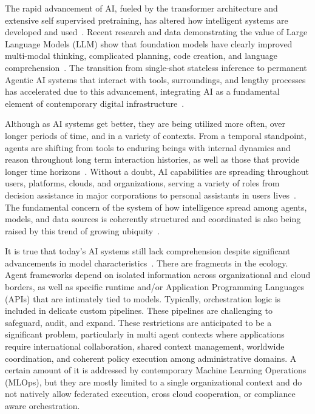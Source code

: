 \documentclass[final,5p,times,twocolumn,authoryear,draft]{elsarticle}
\begin{document}
The rapid advancement of AI, fueled by the transformer architecture and extensive self supervised pretraining, has altered how intelligent systems are developed and used~\cite{Kotei}. Recent research and data demonstrating the value of Large Language Models (LLM) show that foundation models have clearly improved multi-modal thinking, complicated planning, code creation, and language comprehension~\cite{Chen}. The transition from single-shot stateless inference to permanent Agentic AI systems that interact with tools, surroundings, and lengthy processes has accelerated due to this advancement, integrating AI as a fundamental element of contemporary digital infrastructure~\cite{Meleka}.

Although as AI systems get better, they are being utilized more often, over longer periods of time, and in a variety of contexts. From a temporal standpoint, agents are shifting from tools to enduring beings with internal dynamics and reason throughout long term interaction histories, as well as those that provide longer time horizons~\cite{Liu}. Without a doubt, AI capabilities are spreading throughout users, platforms, clouds, and organizations, serving a variety of roles from decision assistance in major corporations to personal assistants in users lives~\cite{Davenport}. The fundamental concern of the system of how intelligence spread among agents, models, and data sources is coherently structured and coordinated is also being raised by this trend of growing ubiquity~\cite{Zhu}.

It is true that today's AI systems still lack comprehension despite significant advancements in model characteristics~\cite{Minh}. There are fragments in the ecology. Agent frameworks depend on isolated information across organizational and cloud borders, as well as specific runtime and/or Application Programming Languages (APIs) that are intimately tied to models. Typically, orchestration logic is included in delicate custom pipelines. These pipelines are challenging to safeguard, audit, and expand. These restrictions are anticipated to be a significant problem, particularly in multi agent contexts where applications require international collaboration, shared context management, worldwide coordination, and coherent policy execution among administrative domains. A certain amount of it is addressed by contemporary Machine Learning Operations (MLOps), but they are mostly limited to a single organizational context and do not natively allow federated execution, cross cloud cooperation, or compliance aware orchestration.
\end{document}
